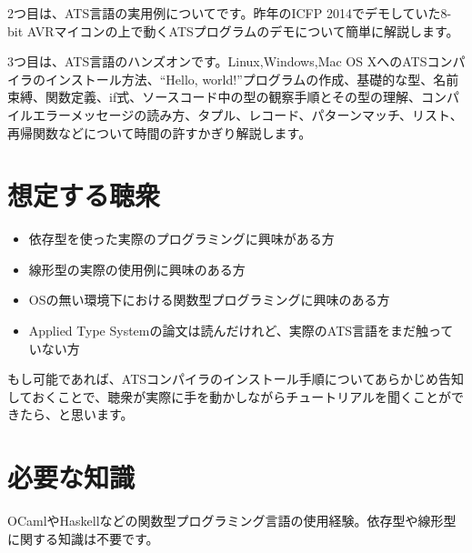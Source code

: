 \documentclass[japanese]{jssst_ppl} %
\begin{document}
2つ目は、ATS言語の実用例についてです。昨年のICFP 2014でデモしていた8-bit AVRマイコン\cite{arduino-uno}の上で動くATSプログラムのデモ\cite{arduino-ats}について簡単に解説\cite{20141019-osc-tokyoats}します。

3つ目は、ATS言語のハンズオンです。Linux,Windows,Mac OS XへのATSコンパイラのインストール方法、``Hello, world!''プログラムの作成、基礎的な型、名前束縛、関数定義、if式、ソースコード中の型の観察手順とその型の理解、コンパイルエラーメッセージの読み方、タプル、レコード、パターンマッチ、リスト、再帰関数などについて時間の許すかぎり解説します。

\section{想定する聴衆}

\begin{itemize}
\item 依存型を使った実際のプログラミングに興味がある方
\item 線形型の実際の使用例に興味のある方
\item OSの無い環境下における関数型プログラミングに興味のある方
\item Applied Type Systemの論文\cite{ATStypes03}は読んだけれど、実際のATS言語をまだ触っていない方
\end{itemize}

もし可能であれば、ATSコンパイラのインストール手順についてあらかじめ告知しておくことで、聴衆が実際に手を動かしながらチュートリアルを聞くことができたら、と思います。

\section{必要な知識}

OCamlやHaskellなどの関数型プログラミング言語の使用経験。依存型や線形型に関する知識は不要です。



\end{document}
